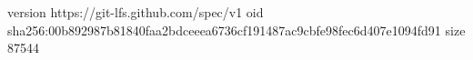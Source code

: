 version https://git-lfs.github.com/spec/v1
oid sha256:00b892987b81840faa2bdceeea6736cf191487ac9cbfe98fec6d407e1094fd91
size 87544
